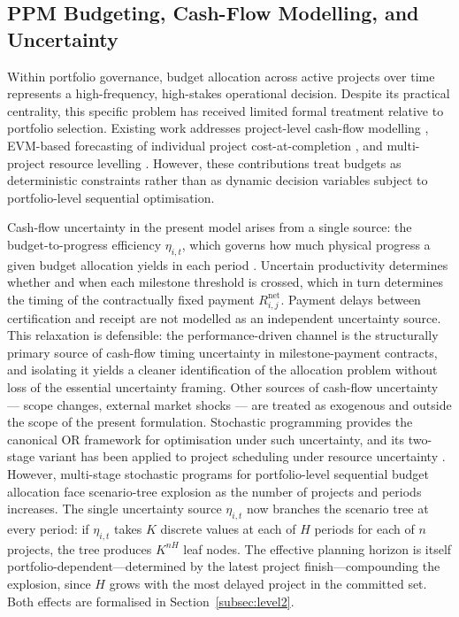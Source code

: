 \subsection{PPM Budgeting, Cash-Flow Modelling, and Uncertainty}
\label{subsec:lr_cashflow}

Within portfolio governance, budget allocation across active projects over time
represents a high-frequency, high-stakes operational decision. Despite its
practical centrality, this specific problem has received limited formal
treatment relative to portfolio selection. Existing work addresses project-level
cash-flow modelling \citep{Kenley2009, Park2004}, EVM-based forecasting of
individual project cost-at-completion \citep{Kim2002, Acebes2015}, and
multi-project resource levelling \citep{Lova2000, Peteghem2010}. However,
these contributions treat budgets as deterministic constraints rather than as
dynamic decision variables subject to portfolio-level sequential optimisation.

Cash-flow uncertainty in the present model arises from a single source:
the budget-to-progress efficiency $\eta_{i,t}$, which governs how much
physical progress a given budget allocation yields in each period
\citep{Acebes2015, Batselier2017}. Uncertain productivity determines whether
and when each milestone threshold is crossed, which in turn determines the
timing of the contractually fixed payment $R_{i,j}^{\mathrm{net}}$. Payment
delays between certification and receipt are not modelled as an independent
uncertainty source. This relaxation is defensible: the performance-driven
channel is the structurally primary source of cash-flow timing uncertainty
in milestone-payment contracts, and isolating it yields a cleaner
identification of the allocation problem without loss of the essential
uncertainty framing. Other sources of cash-flow uncertainty --- scope
changes, external market shocks \citep{Doloi2012} --- are treated as exogenous
and outside the scope of the present formulation. Stochastic programming
\citep{Birge2011} provides the canonical OR framework for optimisation under
such uncertainty, and its two-stage variant has been applied to project
scheduling under resource uncertainty \citep{Lova2000}. However, multi-stage
stochastic programs for portfolio-level sequential budget
allocation face scenario-tree explosion as the number of projects and
periods increases. The single uncertainty source $\eta_{i,t}$ now branches the
scenario tree at every period: if $\eta_{i,t}$ takes $K$ discrete values at
each of $H$ periods for each of $n$ projects, the tree produces $K^{nH}$ leaf
nodes. The effective planning horizon is itself portfolio-dependent---determined
by the latest project finish---compounding the explosion, since $H$ grows with
the most delayed project in the committed set. Both effects are formalised in
Section~\ref{subsec:level2}.

